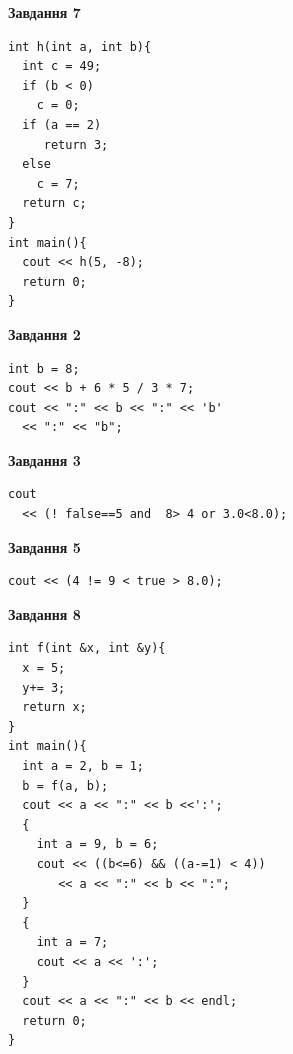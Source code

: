 \documentclass[12pt, ukrainian]{article}
\begin{document}
{\begin {large}
\begin{minipage}[t]{7.0cm}
\begin{center}
\textbf{Завдання 7}
\end{center}
\vspace{-8mm}

\begin{verbatim}
int h(int a, int b){
  int c = 49;
  if (b < 0)
    c = 0;
  if (a == 2)
     return 3;
  else
    c = 7;
  return c;
}
int main(){
  cout << h(5, -8);
  return 0;
}
\end{verbatim}

\end{minipage}
\vline \hspace{1mm}
\begin{minipage}[t]{11.0cm}

\begin{center}
\textbf{Завдання 2}
\end{center}
\vspace{-8mm}

\begin{verbatim}
int b = 8;
cout << b + 6 * 5 / 3 * 7;
cout << ":" << b << ":" << 'b' 
  << ":" << "b";
\end{verbatim}



\begin{center}
\textbf{Завдання 3}
\end{center}
\vspace{-8mm}

\begin{verbatim}
cout 
  << (! false==5 and  8> 4 or 3.0<8.0);
\end{verbatim}



\begin{center}
\textbf{Завдання 5}
\end{center}
\vspace{-8mm}

\begin{verbatim}
cout << (4 != 9 < true > 8.0);
\end{verbatim}



\begin{center}
\textbf{Завдання 8}
\end{center}
\vspace{-8mm}

\begin{verbatim}
int f(int &x, int &y){
  x = 5;
  y+= 3;
  return x;
}
int main(){
  int a = 2, b = 1;
  b = f(a, b);
  cout << a << ":" << b <<':';
  {
    int a = 9, b = 6;
    cout << ((b<=6) && ((a-=1) < 4))
       << a << ":" << b << ":";
  }
  {
    int a = 7;
    cout << a << ':';
  }
  cout << a << ":" << b << endl;
  return 0;
}
\end{verbatim}


\end{minipage}
\end{large}}
\end{document}
